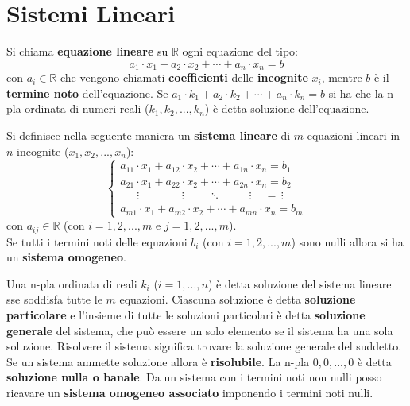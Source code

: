 \documentclass[a4paper,12pt, oneside]{book}
\begin{document}
\section{Sistemi Lineari}
\begin{definizione}
	Si chiama \textbf{equazione lineare} su $\mathbb{R}$ ogni equazione del tipo:
	$$a_1\cdot x_1+a_2\cdot x_2+\cdots +a_n\cdot x_n=b$$
	con $a_i\in \mathbb{R}$ che vengono chiamati \textbf{coefficienti} delle \textbf{incognite} $x_i$, mentre $b$ è il \textbf{termine noto} dell'equazione. Se $a_1\cdot k_1+a_2\cdot k_2+\cdots +a_n\cdot k_n=b$ si ha che la n-pla ordinata di numeri reali ($k_1,k_2,...,k_n$) è detta soluzione dell'equazione.
\end{definizione}
\begin{definizione}
	Si definisce nella seguente maniera un \textbf{sistema lineare} di $m$ equazioni lineari in $n$ incognite ($x_1,x_2,...,x_n$):
	$$
		\begin{cases}
			a_{11}\cdot x_1+a_{12}\cdot x_2+\cdots+a_{1n}\cdot x_n=b_1                                                                                                                         \\
			a_{21}\cdot x_1+a_{22}\cdot x_2+\cdots+a_{2n}\cdot x_n=b_2                                                                                                                         \\
			\,\,\,\,\,\,\,\,\,\vdots \,\,\,\,\,\,\,\,\,\,\,\,\,\,\,\,\,\,\,\,\,\,\, \vdots \,\,\,\,\,\,\,\,\,\,\,\,\, \ddots \,\,\,\,\,\,\,\,\,\,\,\,\,\,\, \vdots \,\,\,\,\,\,\,  = \, \vdots \\
			a_{m1}\cdot x_1+a_{m2}\cdot x_2+\cdots+a_{mn}\cdot x_n=b_m
		\end{cases}$$
	con $a_{ij}\in\mathbb{R}$ (con $i=1,2,...,m$ e $ j=1,2,...,m$).\\
	Se tutti i termini noti delle equazioni $b_i$ (con $i=1,2,...,m$) sono nulli allora si ha un \textbf{sistema omogeneo}.
\end{definizione}
Una n-pla ordinata di reali $k_i$ ($i=1,...,n$) è detta soluzione del sistema lineare sse soddisfa tutte le $m$ equazioni. Ciascuna soluzione è detta \textbf{soluzione particolare} e l'insieme di tutte le soluzioni particolari è detta \textbf{soluzione generale} del sistema, che può essere un solo elemento se il sistema ha una sola soluzione. Risolvere il sistema significa trovare la soluzione generale del suddetto. Se un sistema ammette soluzione allora è \textbf{risolubile}. La n-pla $0,0,...,0$ è detta \textbf{soluzione nulla o banale}. Da un sistema con i termini noti non nulli posso ricavare un \textbf{sistema omogeneo associato} imponendo i termini noti nulli.
\end{document}
